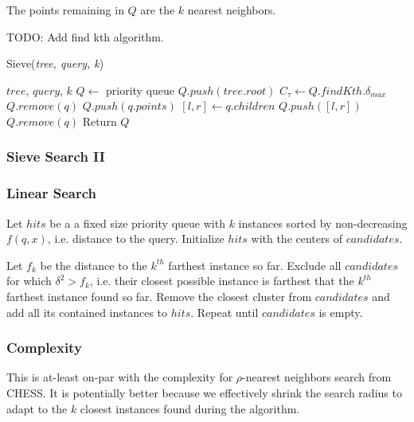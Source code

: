 The points remaining in $Q$ are the $k$ nearest neighbors.

TODO: Add find kth algorithm. 

\begin{algorithm} %
    \caption{Sieve(\emph{tree, query, k})} %
    \label{alg:sieve1} %
    \begin{algorithmic}[5] %
        \REQUIRE $tree$, $query$, $k$
        \STATE $Q \leftarrow$ priority queue
        \STATE $Q.push(tree.root)$
            \STATE $C_{\tau} \leftarrow Q.findKth.\delta_{max}$
                    \STATE $Q.remove(q)$
                \ENDIF
            \ENDFOR
                    \STATE $Q.push(q.points)$
                \ELSE
                    \STATE $[l, r] \leftarrow q.children$
                    \STATE $Q.push([l, r])$   
                \ENDIF
                \STATE $Q.remove(q)$
            \ENDFOR 
        \ENDWHILE
        \STATE Return $Q$
    \end{algorithmic}
    \end{algorithm}

\subsubsection{Sieve Search II}
\label{subsubsec:methods:knn-search:sieve2}

\subsubsection{Linear Search}
\label{subsubsec:methods:knn-search:leaf-search}

Let $hits$ be a a fixed size priority queue with $k$ instances sorted by non-decreasing $f(q, x)$, i.e. distance to the query.
Initialize $hits$ with the centers of $candidates$.

Let $f_k$ be the distance to the $k^{th}$ farthest instance so far.
Exclude all $candidates$ for which $\delta^2 > f_k$, i.e. their closest possible instance is farthest that the $k^{th}$ farthest instance found so far.
Remove the closest cluster from $candidates$ and add all its contained instances to $hits$.
Repeat until $candidates$ is empty.

\subsubsection{Complexity}
\label{subsubsec:methods:knn-search:complexity}

This is at-least on-par with the complexity for $\rho$-nearest neighbors search from CHESS.
It is potentially better because we effectively shrink the search radius to adapt to the $k$ closest instances found during the algorithm.
